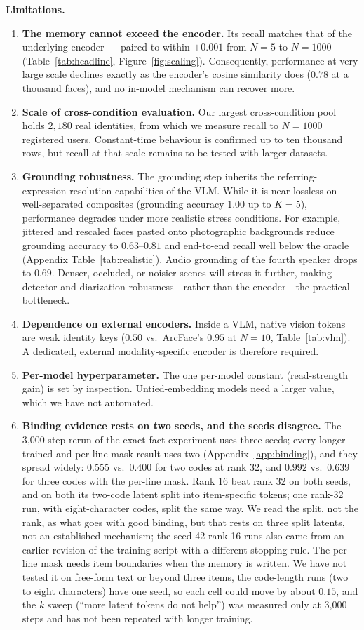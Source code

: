 \textbf{Limitations.}
\begin{enumerate}
  \item \textbf{The memory cannot exceed the encoder.} Its recall matches that of the underlying encoder --- paired to within $\pm0.001$ from $N{=}5$ to $N{=}1000$ (Table~\ref{tab:headline}, Figure~\ref{fig:scaling}). Consequently, performance at very large scale declines exactly as the encoder's cosine similarity does ($0.78$ at a thousand faces), and no in-model mechanism can recover more.
  \item \textbf{Scale of cross-condition evaluation.} Our largest cross-condition pool holds $2{,}180$ real identities, from which we measure recall to $N{=}1000$ registered users. Constant-time behaviour is confirmed up to ten thousand rows, but recall at that scale remains to be tested with larger datasets. 
  \item \textbf{Grounding robustness.} The grounding step inherits the referring-expression resolution capabilities of the VLM. While it is near-lossless on well-separated composites (grounding accuracy $1.00$ up to $K{=}5$), performance degrades under more realistic stress conditions. For example, jittered and rescaled faces pasted onto photographic backgrounds reduce grounding accuracy to $0.63$--$0.81$ and end-to-end recall well below the oracle (Appendix Table~\ref{tab:realistic}). Audio grounding of the fourth speaker drops to $0.69$. Denser, occluded, or noisier scenes will stress it further, making detector and diarization robustness---rather than the encoder---the practical bottleneck.
  \item \textbf{Dependence on external encoders.} Inside a VLM, native vision tokens are weak identity keys ($0.50$ vs.\ ArcFace's $0.95$ at $N{=}10$, Table~\ref{tab:vlm}). A dedicated, external modality-specific encoder is therefore required.
  \item \textbf{Per-model hyperparameter.} The one per-model constant (read-strength gain) is set by inspection. Untied-embedding models need a larger value, which we have not automated. 
  \item \textbf{Binding evidence rests on two seeds, and the seeds disagree.} The 3{,}000-step rerun of the exact-fact experiment uses three seeds; every longer-trained and per-line-mask result uses two (Appendix~\ref{app:binding}), and they spread widely: $0.555$ vs.\ $0.400$ for two codes at rank 32, and $0.992$ vs.\ $0.639$ for three codes with the per-line mask. Rank 16 beat rank 32 on both seeds, and on both its two-code latent split into item-specific tokens; one rank-32 run, with eight-character codes, split the same way. We read the split, not the rank, as what goes with good binding, but that rests on three split latents, not an established mechanism; the seed-42 rank-16 runs also came from an earlier revision of the training script with a different stopping rule. The per-line mask needs item boundaries when the memory is written. We have not tested it on free-form text or beyond three items, the code-length runs (two to eight characters) have one seed, so each cell could move by about $0.15$, and the $k$ sweep (``more latent tokens do not help'') was measured only at 3{,}000 steps and has not been repeated with longer training.

\end{enumerate}
